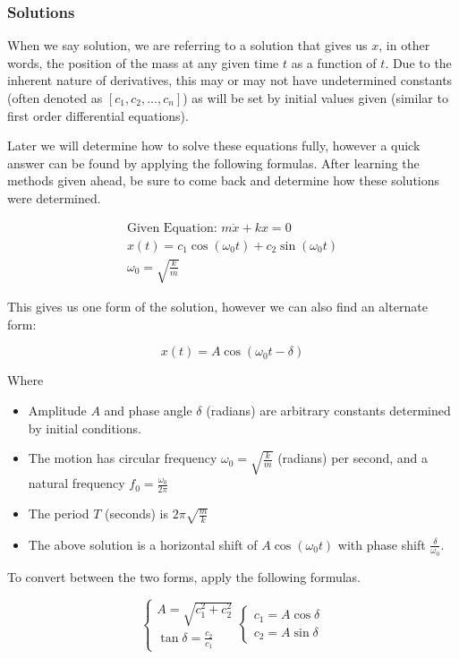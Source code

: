 \documentclass[12pt, landscape, twocolumn]{article}
\begin{document}
        \subsubsection{Solutions}
        When we say solution, we are referring to a solution that gives us $x$, in other words, the position of the mass at any given time $t$ as a function of $t$. Due to the inherent nature of derivatives, this may or may not have undetermined constants (often denoted as $[c_1, c_2, \dots, c_n]$) as will be set by initial values given (similar to first order differential equations).

        Later we will determine how to solve these equations fully, however a quick answer can be found by applying the following formulas. After learning the methods given ahead, be sure to come back and determine how these solutions were determined.

            \[ \begin{aligned}
                \text{Given Equation: } m \ddot{x} + kx = 0\\
                x(t) = c_1 \cos \left( \omega_0 t \right) + c_2 \sin \left( \omega_0 t \right)\\
                \omega_0 = \sqrt{\frac{k}{m} }
            \end{aligned} \]

        This gives us one form of the solution, however we can also find an alternate form:

            \[ x(t) = A \cos \left( \omega_0 t - \delta \right) \]

        Where
            \begin{itemize}
                \item Amplitude $A$ and phase angle $\delta$ (radians) are arbitrary constants determined by initial conditions.
                \item The motion has circular frequency $\omega_0 = \sqrt{\frac{k}{m} }$ (radians) per second, and a natural frequency $f_0 = \frac{\omega_0}{2 \pi}$
                \item The period $T$ (seconds) is $2 \pi \sqrt{\frac{m}{k} }$
                \item The above solution is a horizontal shift of $A \cos (\omega_0 t)$ with phase shift $\frac{\delta}{\omega_0}$.
            \end{itemize}

        To convert between the two forms, apply the following formulas.

            \[
                \begin{cases}
                    A = \sqrt{c_1^2 + c_2^2}\\
                    \tan \delta = \frac{c_2}{c_1}
                \end{cases}
                \begin{cases}
                    c_1 = A \cos \delta\\
                    c_2 = A \sin \delta
                \end{cases}
            \]
\end{document}
